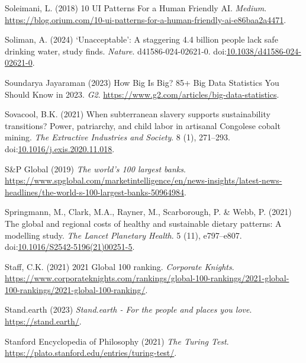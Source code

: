 \documentclass[
  letterpaper,
  DIV=11,
  numbers=noendperiod]{scrartcl}
\newlength{\cslhangindent}
\newenvironment{CSLReferences}[2] %
 {\begin{list}{}{%
  \setlength{\itemindent}{0pt}
  \setlength{\leftmargin}{0pt}
  \setlength{\parsep}{0pt}
  \ifodd #1
   \setlength{\leftmargin}{\cslhangindent}
   \setlength{\itemindent}{-1\cslhangindent}
  \fi
  \setlength{\itemsep}{#2\baselineskip}}}
 {\end{list}}
\begin{document}
\begin{CSLReferences}{0}{1}
Soleimani, L. (2018) 10 {UI Patterns For} a {Human Friendly AI}.
\emph{Medium}.
\url{https://blog.orium.com/10-ui-patterns-for-a-human-friendly-ai-e86baa2a4471}.

Soliman, A. (2024) {`{Unacceptable}'}: A staggering 4.4 billion people
lack safe drinking water, study finds. \emph{Nature}.
d41586-024-02621-0.
doi:\href{https://doi.org/10.1038/d41586-024-02621-0}{10.1038/d41586-024-02621-0}.

Soundarya Jayaraman (2023) How {Big Is Big}? 85+ {Big Data Statistics
You Should Know} in 2023. \emph{G2}.
\url{https://www.g2.com/articles/big-data-statistics}.

Sovacool, B.K. (2021) When subterranean slavery supports sustainability
transitions? Power, patriarchy, and child labor in artisanal {Congolese}
cobalt mining. \emph{The Extractive Industries and Society}. 8 (1),
271--293.
doi:\href{https://doi.org/10.1016/j.exis.2020.11.018}{10.1016/j.exis.2020.11.018}.

S\&P Global (2019) \emph{The world's 100 largest banks}.
\url{https://www.spglobal.com/marketintelligence/en/news-insights/latest-news-headlines/the-world-s-100-largest-banks-50964984}.

Springmann, M., Clark, M.A., Rayner, M., Scarborough, P. \& Webb, P.
(2021) The global and regional costs of healthy and sustainable dietary
patterns: A modelling study. \emph{The Lancet Planetary Health}. 5 (11),
e797--e807.
doi:\href{https://doi.org/10.1016/S2542-5196(21)00251-5}{10.1016/S2542-5196(21)00251-5}.

Staff, C.K. (2021) 2021 {Global} 100 ranking. \emph{Corporate Knights}.
\url{https://www.corporateknights.com/rankings/global-100-rankings/2021-global-100-rankings/2021-global-100-ranking/}.

Stand.earth (2023) \emph{Stand.earth - {For} the people and places you
love}. \url{https://stand.earth/}.

Stanford Encyclopedia of Philosophy (2021) \emph{The {Turing Test}}.
\url{https://plato.stanford.edu/entries/turing-test/}.


\end{CSLReferences}
\end{document}

